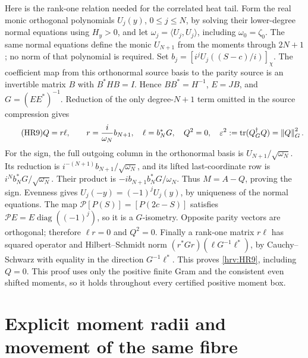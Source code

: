 \documentclass[11pt]{article}
\begin{document}
Here is the rank-one relation needed for the correlated heat tail.
Form the real monic orthogonal polynomials \(U_j(y)\), \(0\le j\le N\),
by solving their lower-degree normal equations using \(H_y>0\), and
let \(\omega_j=\langle U_j,U_j\rangle\), including
\(\omega_0=\zeta_0\). The same normal equations define the monic
\(U_{N+1}\) from the moments through \(2N+1\); no norm of that polynomial
is required. Set \(b_j=[i^jU_j((S-c)/i)]_\chi\). The coefficient map
from this orthonormal source basis to the parity source is an invertible
matrix \(B\) with \(B^*HB=I\). Hence \(BB^*=H^{-1}\),
\(E=JB\), and \(G=(EE^*)^{-1}\). Reduction of the only degree-\(N+1\)
term omitted in the source compression gives
\begin{equation}\tag{HR9}\label{hrv:HR9}
Q=r\ell,\qquad r=\frac{i}{\omega_N}b_{N+1},\quad
\ell=b_N^*G,\quad Q^2=0,\quad
\varepsilon^2:=\operatorname{tr}(Q^\dagger_G Q)=\left\lVert Q\right\rVert_G^2.
\end{equation}
For the sign, the full outgoing column in the orthonormal basis is
\(U_{N+1}/\sqrt{\omega_N}\). Its reduction is
\(i^{-(N+1)}b_{N+1}/\sqrt{\omega_N}\), and its lifted last-coordinate
row is \(i^N b_N^*G/\sqrt{\omega_N}\). Their product is
\(-i b_{N+1}b_N^*G/\omega_N\). Thus \(M=A-Q\), proving the sign.
Evenness gives \(U_j(-y)=(-1)^jU_j(y)\), by uniqueness of the normal
equations. The map \(\mathcal P[P(S)]=[P(2c-S)]\) satisfies
\(\mathcal PE=E\operatorname{diag}((-1)^j)\), so it is a \(G\)-isometry.
Opposite parity vectors are orthogonal; therefore \(\ell r=0\) and
\(Q^2=0\). Finally a rank-one matrix \(r\ell\) has squared operator
and Hilbert--Schmidt norm \((r^*Gr)(\ell G^{-1}\ell^*)\), by
Cauchy--Schwarz with equality in the direction \(G^{-1}\ell^*\).
This proves \eqref{hrv:HR9}, including \(Q=0\). This proof uses only the
positive finite Gram and the consistent even shifted moments, so it
holds throughout every certified positive moment box.

\section{Explicit moment radii and movement of the same fibre}
\end{document}
